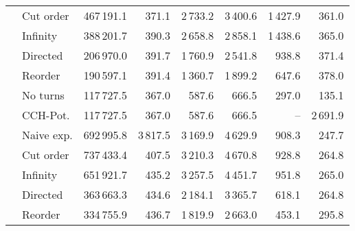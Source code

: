 \begin{tabular}{llrrrrrr}
       & Cut order &                 467\,191.1 &           371.1 &                                     2\,733.2 &                                       3\,400.6 & 1\,427.9 &  361.0 \\
       & Infinity &                 388\,201.7 &           390.3 &                                     2\,658.8 &                                       2\,858.1 & 1\,438.6 &  365.0 \\
       & Directed &                 206\,970.0 &           391.7 &                                     1\,760.9 &                                       2\,541.8 &  938.8 &  371.4 \\
       & Reorder &                 190\,597.1 &           391.4 &                                     1\,360.7 &                                       1\,899.2 &  647.6 &  378.0 \\
\addlinespace \multirow{7}{*}{\rotatebox[origin=c]{90}{Europe}} & No turns &                 117\,727.5 &           367.0 &                                      587.6 &                                        666.5 &  297.0 &  135.1 \\
       & CCH-Pot. &                 117\,727.5 &           367.0 &                                      587.6 &                                        666.5 &    -- & 2\,691.9 \\
       & Naive exp. &                 692\,995.8 &          3\,817.5 &                                     3\,169.9 &                                       4\,629.9 &  908.3 &  247.7 \\
       & Cut order &                 737\,433.4 &           407.5 &                                     3\,210.3 &                                       4\,670.8 &  928.8 &  264.8 \\
       & Infinity &                 651\,921.7 &           435.2 &                                     3\,257.5 &                                       4\,451.7 &  951.8 &  265.0 \\
       & Directed &                 363\,663.3 &           434.6 &                                     2\,184.1 &                                       3\,365.7 &  618.1 &  264.8 \\
       & Reorder &                 334\,755.9 &           436.7 &                                     1\,819.9 &                                       2\,663.0 &  453.1 &  295.8 \\
\bottomrule
\end{tabular}

